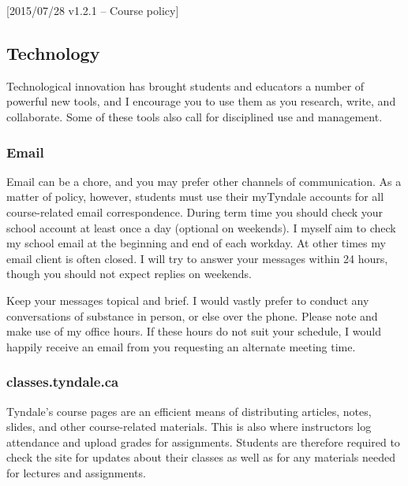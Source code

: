 [2015/07/28 v1.2.1 -- Course policy]

\subsection{Technology}
\label{technology}

Technological innovation has brought students and educators a number of
powerful new tools, and I encourage you to use them as you research, write, and
collaborate. Some of these tools also call for disciplined use and management.

\subsubsection{Email}
\label{email}

Email can be a chore, and you may prefer other channels of communication. As a
matter of policy, however, students must use their myTyndale accounts for all
course-related email correspondence. During term time you should check your
school account at least once a day (optional on weekends). I myself aim to
check my school email at the beginning and end of each workday. At other times
my email client is often closed. I will try to answer your messages within 24
hours, though you should not expect replies on weekends.

Keep your messages topical and brief. I would vastly prefer to conduct any
conversations of substance in person, or else over the phone. Please note and
make use of my office hours. If these hours do not suit your schedule, I would
happily receive an email from you requesting an alternate meeting time.


\subsubsection{classes.tyndale.ca}
\label{lms}

Tyndale's course pages are an efficient means of distributing articles, notes,
slides, and other course-related materials. This is also where instructors log
attendance and upload grades for assignments. Students are therefore required to
check the site for updates about their classes as well as for any materials
needed for lectures and assignments.


